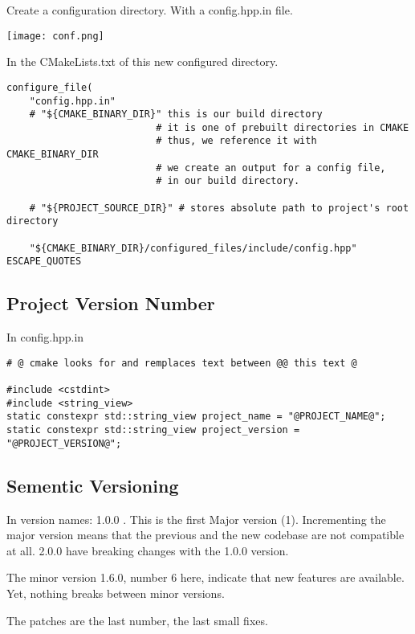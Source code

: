 Create a configuration directory. With a config.hpp.in file.

\begin{center}
    \texttt{[image: conf.png]}
\end{center}

In the CMakeLists.txt of this new configured directory.

\begin{verbatim}
configure_file(
    "config.hpp.in"
    # "${CMAKE_BINARY_DIR}" this is our build directory
                          # it is one of prebuilt directories in CMAKE
                          # thus, we reference it with CMAKE_BINARY_DIR
                          # we create an output for a config file, 
                          # in our build directory.

    # "${PROJECT_SOURCE_DIR}" # stores absolute path to project's root directory

    "${CMAKE_BINARY_DIR}/configured_files/include/config.hpp" ESCAPE_QUOTES 
\end{verbatim}

\subsection{Project Version Number}

In config.hpp.in

\begin{verbatim}
# @ cmake looks for and remplaces text between @@ this text @

#include <cstdint>
#include <string_view> 
static constexpr std::string_view project_name = "@PROJECT_NAME@";
static constexpr std::string_view project_version = "@PROJECT_VERSION@";
\end{verbatim}




\subsection{Sementic Versioning}

In version names: 1.0.0 . This is the first Major version (1). Incrementing the major version means
that the previous and the new codebase are not compatible at all. 2.0.0 have breaking changes with the 1.0.0 version.

The minor version 1.6.0, number 6 here, indicate that new features are available. Yet, nothing breaks between minor versions.

The patches are the last number, the last small fixes.

